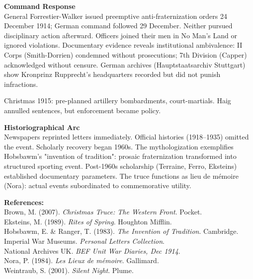 \begin{technical}
\noindent\textbf{Command Response}\\[0.5em]
General Forrestier-Walker issued preemptive anti-fraternization orders 24 December 1914; German command followed 29 December. Neither pursued disciplinary action afterward. Officers joined their men in No Man's Land or ignored violations. Documentary evidence reveals institutional ambivalence: II Corps (Smith-Dorrien) condemned without prosecutions; 7th Division (Capper) acknowledged without censure. German archives (Hauptstaatsarchiv Stuttgart) show Kronprinz Rupprecht's headquarters recorded but did not punish infractions.

Christmas 1915: pre-planned artillery bombardments, court-martials. Haig annulled sentences, but enforcement became policy. 

\noindent\textbf{Historiographical Arc}\\[0.5em]
Newspapers reprinted letters immediately. Official histories (1918–1935) omitted the event. Scholarly recovery began 1960s. The mythologization exemplifies Hobsbawm's "invention of tradition": prosaic fraternization transformed into structured sporting event. Post-1960s scholarship (Terraine, Ferro, Eksteins) established documentary parameters. The truce functions as lieu de mémoire (Nora): actual events subordinated to commemorative utility.

\vspace{0.5em}
\noindent\textbf{References:}\\
Brown, M. (2007). \textit{Christmas Truce: The Western Front}. Pocket.\\
Eksteins, M. (1989). \textit{Rites of Spring}. Houghton Mifflin.\\
Hobsbawm, E. \& Ranger, T. (1983). \textit{The Invention of Tradition}. Cambridge.\\
Imperial War Museums. \textit{Personal Letters Collection}.\\
National Archives UK. \textit{BEF Unit War Diaries, Dec 1914}.\\
Nora, P. (1984). \textit{Les Lieux de mémoire}. Gallimard.\\
Weintraub, S. (2001). \textit{Silent Night}. Plume.
\end{technical}
